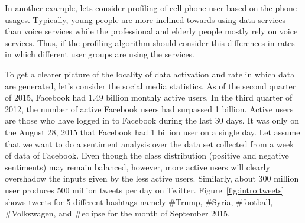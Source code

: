 \documentclass[a4paper, 11pt, oneside]{book}
\begin{document}
In another example, lets consider profiling of cell phone user based on the phone usages. Typically, young people are more inclined towards using data services than voice services while the professional and elderly people mostly rely on voice services. Thus, if the profiling algorithm should consider this differences in rates in which different user groups are using the services.

To get a clearer picture of the locality of data activation and rate in which data are generated, let's consider the social media statistics. As of the second quarter of 2015, Facebook had 1.49 billion monthly active users. In the third quarter of 2012, the number of active Facebook users had surpassed 1 billion. Active users are those who have logged in to Facebook during the last 30 days. It was only on the August 28, 2015 that Facebook had 1 billion user on a single day. Let assume that we want to do a sentiment analysis over the data set collected from a week of data of Facebook. Even though the class distribution (positive and negative sentiments)  may remain balanced, however, more active users will clearly overshadow the inputs given by the less active users. Similarly, about 300 million user produces 500 million tweets per day on Twitter. Figure~\ref{fig:intro:tweets} shows tweets for 5 different hashtags namely \#Trump, \#Syria, \#football, \#Volkswagen, and \#eclipse for the month of September 2015. 
\end{document}
